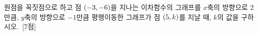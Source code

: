 원점을 꼭짓점으로 하고 점 $(-3{,}\mkern3mu\mathopen{}-6)$을 지나는 이차함수의 그래프를 $x$축의 방향으로 $2$만큼, $y$축의 방향으로 $-1$만큼 평행이동한 그래프가 점 $(5{,}\mkern3mu\mathopen{}k)$를 지날 때, $k$의 값을 구하시오.~\mbox{\mbox{[7점]}}

